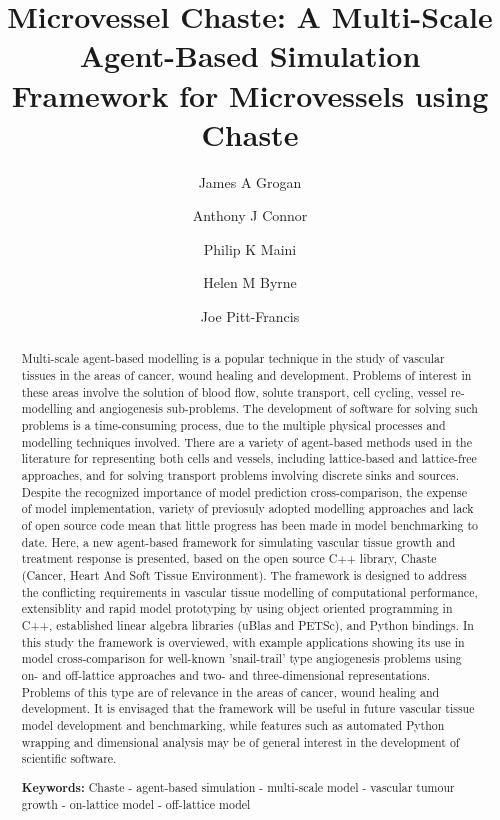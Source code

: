 \documentclass[superscriptaddress, a4paper]{article}
\begin{document}
\title{Microvessel Chaste: A Multi-Scale Agent-Based Simulation Framework for Microvessels using Chaste}

\author[1]{James A Grogan}
\author[1,2]{Anthony J Connor}
\author[1]{Philip K Maini}
\author[1]{Helen M Byrne}
\author[2]{Joe Pitt-Francis}
 
  
\date{}
  
\maketitle

\begin{abstract}
Multi-scale agent-based modelling is a popular technique in the study of vascular tissues in the areas of cancer, wound healing and development. Problems of interest in these areas involve the solution of blood flow, solute transport, cell cycling, vessel re-modelling and angiogenesis sub-problems. The development of software for solving such problems is a time-consuming process, due to the multiple physical processes and modelling techniques involved. There are a variety of agent-based methods used in the literature for representing both cells and vessels, including lattice-based and lattice-free approaches, and for solving transport problems involving discrete sinks and sources. Despite the recognized importance of model prediction cross-comparison, the expense of model implementation, variety of previosuly adopted modelling approaches and lack of open source code mean that little progress has been made in model benchmarking to date. Here, a new agent-based framework for simulating vascular tissue growth and treatment response is presented, based on the open source C++ library, Chaste (Cancer, Heart And Soft Tissue Environment). The framework is designed to address the conflicting requirements in vascular tissue modelling of computational performance, extensiblity and rapid model prototyping by using object oriented programming in C++, established linear algebra libraries (uBlas and PETSc), and Python bindings. In this study the framework is overviewed, with example applications showing its use in model cross-comparison for well-known 'snail-trail' type angiogenesis problems using on- and off-lattice approaches and two- and three-dimensional representations. Problems of this type are of relevance in the areas of cancer, wound healing and development. It is envisaged that the framework will be useful in future vascular tissue model development and benchmarking, while features such as automated Python wrapping and dimensional analysis may be of general interest in the development of scientific software.

\smallskip
\noindent \textbf{Keywords:} Chaste - agent-based simulation - multi-scale model - vascular tumour growth - on-lattice model - off-lattice model

\end{abstract}
\end{document}
